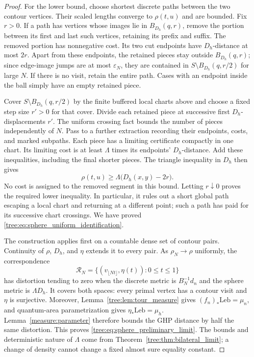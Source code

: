 \begin{proof}
For the lower bound, choose shortest discrete paths between the two
contour vertices.  Their scaled lengths converge to $\rho(t,u)$ and
are bounded.  Fix $r>0$.  If a path has vertices whose images lie in
$B_{D_h}(q,r)$, remove the portion between its first and last such
vertices, retaining its prefix and suffix.  The removed portion has
nonnegative cost.  Its two cut endpoints have $D_h$-distance at most
$2r$.  Apart from these endpoints, the retained pieces stay outside
$B_{D_h}(q,r)$; since edge-image jumps are at most $\varepsilon_N$,
they are contained in $S\setminus B_{D_h}(q,r/2)$ for large $N$.
If there is no visit, retain the entire path.  Cases with an endpoint
inside the ball simply have an empty retained piece.

Cover $S\setminus B_{D_h}(q,r/2)$ by the finite buffered local charts
above and choose a fixed step size $r'>0$ for that cover.  Divide each
retained piece at successive first $D_h$-displacements $r'$.
The uniform crossing fact bounds the number of pieces independently
of $N$.  Pass to a further extraction recording their endpoints,
costs, and marked subpaths.  Each piece has a limiting certificate
compactly in one chart.  Its limiting cost is at least $\Lambda$
times its endpoints' $D_h$-distance.  Add these inequalities, including
the final shorter pieces.  The triangle inequality in $D_h$ then gives
\[
 \rho(t,u)\geq \Lambda\big(D_h(x,y)-2r\big).
\]
No cost is assigned to the removed segment in this bound.  Letting
$r\downarrow0$ proves the required lower inequality.  In particular,
it rules out a short global path escaping a local chart and returning
at a different point; such a path has paid for its successive chart
crossings.  We have proved \eqref{tree:eq:sphere_uniform_identification}.

The construction applies first on a countable dense set of contour
pairs.  Continuity of $\rho$, $D_h$, and $\eta$ extends it to every
pair.  As $\rho_N\to\rho$ uniformly, the correspondence
\[
 \mathcal R_N=\{(v_{\lfloor Nt\rfloor},\eta(t)):0\leq t\leq1\}
\]
has distortion tending to zero when the discrete metric is $B_N^{-1}d_n$
and the sphere metric is $\Lambda D_h$.  It covers both spaces: every
primal vertex has a contour visit and $\eta$ is surjective. Moreover,
Lemma~\ref{tree:lem:tour_measure} gives $(f_n)_*\mathrm{Leb}=\mu_n$,
and quantum-area parametrization gives $\eta_*\mathrm{Leb}=\mu_h$.
Lemma~\ref{measure:parameter} therefore bounds the GHP distance by
half the same distortion. This proves
\eqref{tree:eq:sphere_preliminary_limit}.  The bounds and deterministic
nature of $\Lambda$ come from Theorem~\ref{tree:thm:bilateral_limit}; a change
of density cannot change a fixed almost sure equality constant.
\end{proof}

